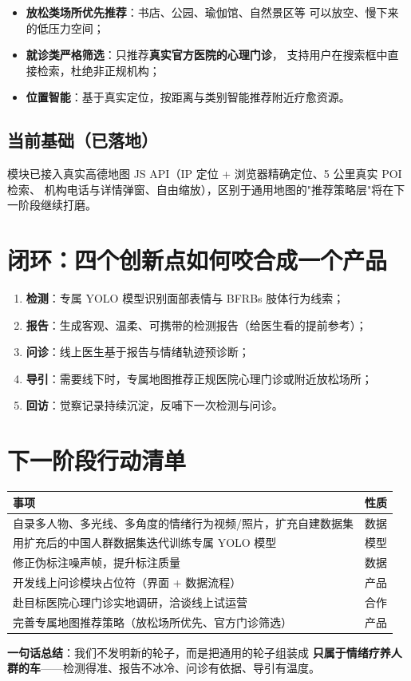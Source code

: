 \documentclass[12pt, a4paper]{ctexart}
\begin{document}
\begin{itemize}
  \item \textbf{放松类场所优先推荐}：书店、公园、瑜伽馆、自然景区等
        可以放空、慢下来的低压力空间；
  \item \textbf{就诊类严格筛选}：只推荐\textbf{真实官方医院的心理门诊}，
        支持用户在搜索框中直接检索，杜绝非正规机构；
  \item \textbf{位置智能}：基于真实定位，按距离与类别智能推荐附近疗愈资源。
\end{itemize}

\subsection{当前基础（已落地）}
模块已接入真实高德地图 JS API（IP 定位 + 浏览器精确定位、5 公里真实 POI 检索、
机构电话与详情弹窗、自由缩放），区别于通用地图的"推荐策略层"将在下一阶段继续打磨。

\section{闭环：四个创新点如何咬合成一个产品}

\begin{enumerate}[label=\textbf{第\arabic*步}，leftmargin=3.2em]
  \item \textbf{检测}：专属 YOLO 模型识别面部表情与 BFRBs 肢体行为线索；
  \item \textbf{报告}：生成客观、温柔、可携带的检测报告（给医生看的提前参考）；
  \item \textbf{问诊}：线上医生基于报告与情绪轨迹预诊断；
  \item \textbf{导引}：需要线下时，专属地图推荐正规医院心理门诊或附近放松场所；
  \item \textbf{回访}：觉察记录持续沉淀，反哺下一次检测与问诊。
\end{enumerate}

\section{下一阶段行动清单}

\begin{center}
\begin{tabular}{p{} p{}}
\toprule
\textbf{事项} & \textbf{性质} \\
\midrule
自录多人物、多光线、多角度的情绪行为视频/照片，扩充自建数据集 & 数据 \\
用扩充后的中国人群数据集迭代训练专属 YOLO 模型 & 模型 \\
修正伪标注噪声帧，提升标注质量 & 数据 \\
开发线上问诊模块占位符（界面 + 数据流程） & 产品 \\
赴目标医院心理门诊实地调研，洽谈线上试运营 & 合作 \\
完善专属地图推荐策略（放松场所优先、官方门诊筛选） & 产品 \\
\bottomrule
\end{tabular}
\end{center}

\vspace{1em}
\noindent\textbf{一句话总结}：我们不发明新的轮子，而是把通用的轮子组装成
\textbf{只属于情绪疗养人群的车}——检测得准、报告不冰冷、问诊有依据、导引有温度。
\end{document}
